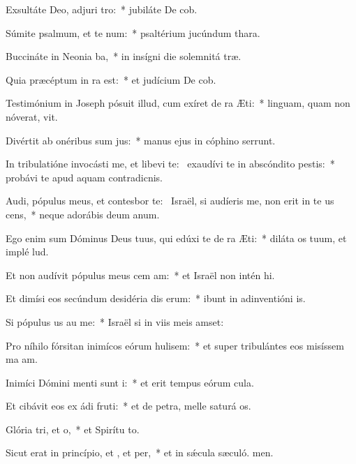 \item Exsultáte Deo, adjuri tro:~* jubiláte De cob.
\item Súmite psalmum, et te num:~* psaltérium jucúndum  thara.
\item Buccináte in Neonia ba,~* in insígni die solemnitá træ.
\item Quia præcéptum in ra est:~* et judícium De cob.
\item Testimónium in Joseph pósuit illud, cum exíret de ra Æti:~* linguam, quam non nóverat, vit.
\item Divértit ab onéribus sum jus:~* manus ejus in cóphino serrunt.
\item In tribulatióne invocásti me, et libevi te:~\pscross{} exaudívi te in abscóndito pestis:~* probávi te apud aquam contradicnis.
\item Audi, pópulus meus, et contesbor te:~\pscross{} Israël, si audíeris me, non erit in te us cens,~* neque adorábis deum anum.
\item Ego enim sum Dóminus Deus tuus, qui edúxi te de ra Æti:~* diláta os tuum, et implé lud.
\item Et non audívit pópulus meus cem am:~* et Israël non intén hi.
\item Et dimísi eos secúndum desidéria dis erum:~* ibunt in adinventióni is.
\item Si pópulus us au me:~* Israël si in viis meis amset:
\item Pro níhilo fórsitan inimícos eórum hulisem:~* et super tribulántes eos misíssem ma am.
\item Inimíci Dómini menti sunt i:~* et erit tempus eórum  cula.
\item Et cibávit eos ex ádi fruti:~* et de petra, melle saturá os.
\item Glória tri, et o,~* et Spirítu to.
\item Sicut erat in princípio, et , et per,~* et in sǽcula sæculó. men.
